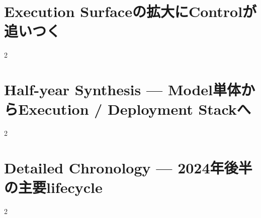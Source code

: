 \documentclass[lualatex,a4paper,11pt]{jlreq}
\begin{document}
\clearpage
\section{Execution Surfaceの拡大にControlが追いつく}
\label{pkg:control-evaluation}

\medskip
\begin{multicols}{2}

\end{multicols}


\clearpage
\section{Half-year Synthesis — Model単体からExecution / Deployment Stackへ}
\label{pkg:synthesis}

\medskip
\begin{multicols}{2}

\end{multicols}


\clearpage
\section{Detailed Chronology — 2024年後半の主要lifecycle}
\label{pkg:chronology}

\medskip
\begin{multicols}{2}

\end{multicols}


\clearpage
\printbibliography[title={References / Source Notes}]
\end{document}
